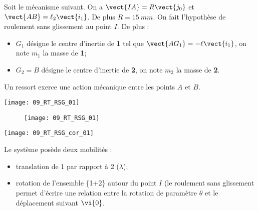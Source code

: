 \normalfalse \difficiletrue \tdifficilefalse
\correctiontrue

\setcounter{question}{0}%
\ifcorrection
\else
{}
\fi

\ifprof
\else
Soit le mécanisme suivant. On a $\vect{IA}=R\vect{j_0}$ et $\vect{AB}=\ell_2\vect{i_1}$. De plus $R=\SI{15}{mm}$.
On fait l'hypothèse de roulement sans glissement au point $I$. De plus :
\begin{itemize}
\item $G_1$ désigne le centre d'inertie de \textbf{1} tel que $\vect{AG_1}=-\ell\vect{i_1}$, on note $m_1$ la masse de \textbf{1};%
\item $G_2=B$ désigne le centre d'inertie de \textbf{2}, on note $m_2$ la masse de \textbf{2}.%
\end{itemize}
Un ressort exerce une action mécanique entre les points $A$ et $B$. 

\fi


\ifprof
\begin{marginfigure}
\texttt{[image: 09\_RT\_RSG\_01]}
\end{marginfigure}
\else

\begin{figure}[!h]
\centering
\texttt{[image: 09\_RT\_RSG\_01]}
\end{figure}
\fi


\ifprof
\begin{marginfigure}
\texttt{[image: 09\_RT\_RSG\_cor\_01]}
\end{marginfigure}

\else
\fi

\ifprof

Le système posède deux mobilités : 
\begin{itemize}
\item translation de 1 par rapport à 2 ($\lambda$);
\item rotation de l'ensemble \{1+2\} autour du point $I$ (le roulement sans glissement permet d'écrire une relation entre la rotation de paramètre $\theta$ et le déplacement suivant $\vi{0}$.
\end{itemize}

